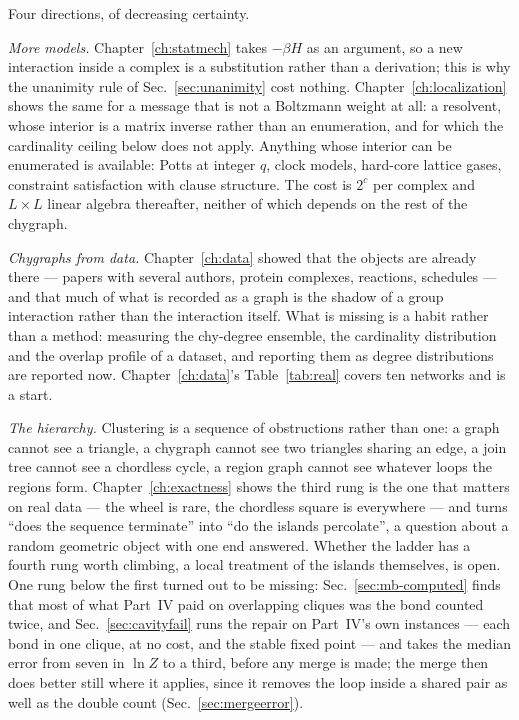 Four directions, of decreasing certainty.

\emph{More models.} Chapter~\ref{ch:statmech} takes $-\beta H$ as an argument,
so a new interaction inside a complex is a substitution rather than a
derivation; this is why the unanimity rule of Sec.~\ref{sec:unanimity} cost
nothing. Chapter~\ref{ch:localization} shows the same for a message that
is not a Boltzmann weight at all: a resolvent, whose interior is a matrix
inverse rather than an enumeration, and for which the cardinality ceiling
below does not apply. Anything whose interior can be enumerated is available: Potts at
integer $q$, clock models, hard-core lattice gases, constraint satisfaction with
clause structure. The cost is $2^{c}$ per complex and $L\times L$ linear algebra
thereafter, neither of which depends on the rest of the chygraph.

\emph{Chygraphs from data.} Chapter~\ref{ch:data} showed that the objects are
already there --- papers with several authors, protein complexes, reactions,
schedules --- and that much of what is recorded as a graph is the shadow of a
group interaction rather than the interaction itself. What is missing is a
habit rather than a method: measuring the chy-degree ensemble, the cardinality
distribution and the overlap profile of a dataset, and reporting them as degree
distributions are reported now. Chapter~\ref{ch:data}'s Table~\ref{tab:real}
covers ten networks and is a start.

\emph{The hierarchy.} Clustering is a sequence of obstructions rather than one:
a graph cannot see a triangle, a chygraph cannot see two triangles sharing an
edge, a join tree cannot see a chordless cycle, a region graph cannot see
whatever loops the regions form. Chapter~\ref{ch:exactness} shows the third
rung is the one that matters on real data --- the wheel is rare, the
chordless square is everywhere --- and turns ``does the sequence terminate''
into ``do the islands percolate'', a question about a random geometric object
with one end answered. Whether the ladder has a fourth rung worth climbing,
a local treatment of the islands themselves, is open. One rung below the
first turned out to be missing: Sec.~\ref{sec:mb-computed} finds that
most of what Part~IV paid on overlapping cliques was the bond counted
twice, and Sec.~\ref{sec:cavityfail} runs the repair on Part~IV's own
instances --- each bond in one clique, at no cost, and the stable fixed
point --- and takes the median error from seven in $\ln Z$ to a third,
before any merge is made; the merge then does better still where it
applies, since it removes the loop inside a shared pair as well as the
double count (Sec.~\ref{sec:mergeerror}).

